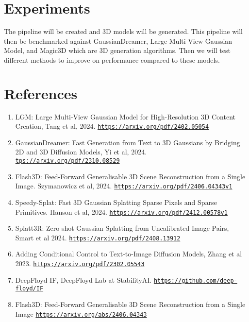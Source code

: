 \documentclass[10pt,twocolumn,letterpaper]{article}
\begin{document}
\section{Experiments}


The pipeline will be created and 3D models will be generated. This pipeline will then be benchmarked against GaussianDreamer, Large Multi-View Gaussian Model, and Magic3D which are 3D generation algorithms. Then we will test different methods to improve on performance compared to these models.

\section*{References}

\begin{enumerate}
	\item LGM: Large Multi-View Gaussian Model for High-Resolution 3D Content Creation, Tang et al, 2024. 
   	 \href{https://arxiv.org/pdf/2402.05054}{\nolinkurl{https://arxiv.org/pdf/2402.05054}}
	\item GaussianDreamer: Fast Generation from Text to 3D Gaussians by Bridging 2D and 3D Diffusion Models, Yi et al, 2024. 
	\href{tps://arxiv.org/pdf/2310.08529}{\nolinkurl{tps://arxiv.org/pdf/2310.08529}}
	\item Flash3D: Feed-Forward Generalisable 3D Scene Reconstruction from a Single Image. Szymanowicz et al, 2024. 
	\href{https://arxiv.org/pdf/2406.04343v1}{\nolinkurl{https://arxiv.org/pdf/2406.04343v1}}
	\item Speedy-Splat: Fast 3D Gaussian Splatting Sparse Pixels and Sparse Primitives. Hanson et al, 2024.
	\href{https://arxiv.org/pdf/2412.00578v1}{\nolinkurl{https://arxiv.org/pdf/2412.00578v1}}
	\item Splatt3R: Zero-shot Gaussian Splatting from Uncalibrated Image Pairs, Smart et al 2024. 
	\href{https://arxiv.org/pdf/2408.13912}{\nolinkurl{https://arxiv.org/pdf/2408.13912}}
	\item Adding Conditional Control to Text-to-Image Diffusion Models, Zhang et al 2023. 
	\href{https://arxiv.org/pdf/2302.05543}{\nolinkurl{https://arxiv.org/pdf/2302.05543}}
	\item DeepFloyd IF, DeepFloyd Lab at StabilityAI. 
	\href{https://github.com/deep-floyd/IF}{\nolinkurl{https://github.com/deep-floyd/IF}}
	\item Flash3D: Feed-Forward Generalisable 3D Scene Reconstruction from a Single Image
	\href{https://arxiv.org/abs/2406.04343}{\nolinkurl{https://arxiv.org/abs/2406.04343}}

	
\end{enumerate}
\end{document}
